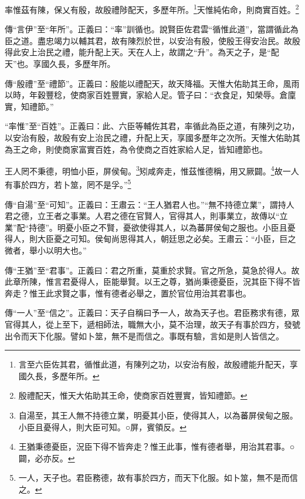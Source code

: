 率惟茲有陳，保乂有殷，故殷禮陟配天，多歷年所。\footnote{言至六臣佐其君，循惟此道，有陳列之功，以安治有殷，故殷禮能升配天，享國久長，多歷年所。}天惟純佑命，則商實百姓。\footnote{殷禮配天，惟天大佑助其王命，使商家百姓豐實，皆知禮節。}


{\noindent\zhuan{}\fzbyks 傳“言伊”至“年所”。正義曰：“率”訓循也。說賢臣佐君雲“循惟此道”，當謂循此為臣之道。盡忠竭力以輔其君，故有陳烈於世，以安治有殷，使殷王得安治民。故殷得此安上治民之禮，能升配上天。天在人上，故謂之“升”。為天之子，是“配天”也。享國久長，多歷年所。 \par}

{\noindent\zhuan{}\fzbyks 傳“殷禮”至“禮節”。正義曰：殷能以禮配天，故天降福。天惟大佑助其王命，風雨以時，年穀豐稔，使商家百姓豐實，家給人足。管子曰：“衣食足，知榮辱。倉廩實，知禮節。” \par}

{\noindent\shu{}\fzkt “率惟”至“百姓”。正義曰：此、六臣等輔佐其君，率循此為臣之道，有陳列之功，以安治有殷，故殷有安上治民之禮，升配上天，享國多歷年之次所。天惟大佑助其為王之命，則使商家富實百姓，為令使商之百姓家給人足，皆知禮節也。 \par}

王人罔不秉德，明恤小臣，屏侯甸。\footnote{自湯至，其王人無不持德立業，明憂其小臣，使得其人，以為蕃屏侯甸之服。小臣且憂得人，則大臣可知。○屏，賓領反。}矧咸奔走，惟茲惟德稱，用又厥闢。\footnote{王猶秉德憂臣，況臣下得不皆奔走？惟王此事，惟有德者舉，用治其君事。○闢，必亦反。}故一人有事於四方，若卜筮，罔不是孚。”\footnote{一人，天子也。君臣務德，故有事於四方，而天下化服。如卜筮，無不是而信之。}


{\noindent\zhuan{}\fzbyks 傳“自湯”至“可知”。正義曰：王肅云：“王人猶君人也。”“無不持德立業”，謂持人君之德，立王者之事業。人君之德在官賢人，官得其人，則事業立，故傳以“立業”配“持德”。明憂小臣之不賢，憂欲使得其人，以為蕃屏侯甸之服也。小臣且憂得人，則大臣憂之可知。侯甸尚思得其人，朝廷思之必矣。王肅云：“小臣，巨之微者，舉小以明大也。” \par}

{\noindent\zhuan{}\fzbyks 傳“王猶”至“君事”。正義曰：君之所重，莫重於求賢。官之所急，莫急於得人。故此章所陳，惟言君憂得人，臣能舉賢。以王之尊，猶尚秉德憂臣，況其臣下得不皆奔走？惟王此求賢之事，惟有德者必舉之，置於官位用治其君事也。 \par}

{\noindent\zhuan{}\fzbyks 傳“一人”至“信之”。正義曰：天子自稱曰予一人，故為天子也。君臣務求有德，眾官得其人，從上至下，遞相師法，職無大小，莫不治理，故天子有事於四方，發號出令而天下化服。譬如卜筮，無不是而信之。事既有驗，言如是則人皆信之。 \par}

